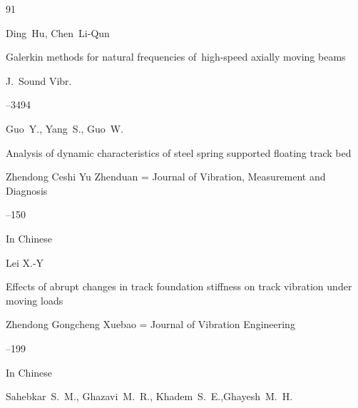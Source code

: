 \begin{thebibliography}{91}



\pagebreak






\by Ding~Hu, Chen~Li-Qun

\paper Galerkin methods for natural frequencies of~high-speed axially moving beams

\jour J.~Sound Vibr.




--3494





\by Guo~Y.,  Yang~S.,  Guo~W.

\paper Analysis of dynamic characteristics of steel spring supported floating track bed 

\jour Zhendong Ceshi Yu Zhenduan = Journal of Vibration, Measurement and Diagnosis




--150

\lang In  Chinese







\by Lei X.-Y

\paper Effects of abrupt changes in track foundation stiffness on track vibration under moving loads

\jour Zhendong Gongcheng Xuebao  = Journal of Vibration Engineering




--199

\lang In  Chinese







\by Sahebkar~S.~M., Ghazavi~M.~R., Khadem~S.~E.,Ghayesh~M.~H.


\end{thebibliography}
